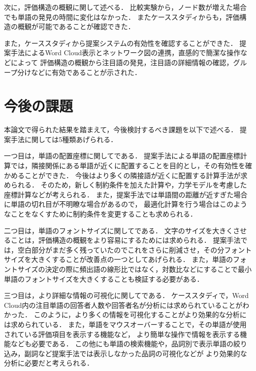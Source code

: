 \documentclass[syuuron]{kuee}
\begin{document}
		次に，評価構造の概観に関して述べる．
		比較実験から，ノード数が増えた場合でも単語の発見の時間に変化はなかった．
		またケーススタディからも，評価構造の概観が可能であることが確認できた．
		
		また，ケーススタディから提案システムの有効性を確認することができた．
		提案手法によるWord Cloud表示とネットワーク図の連携，直感的で簡潔な操作などによって
		評価構造の概観から注目語の発見，注目語の詳細情報の確認，グループ分けなどに有効であることが示された．		
		
	\section{今後の課題}
		本論文で得られた結果を踏まえて，今後検討するべき課題を以下で述べる．
		提案手法に関しては5種類あげられる．
		
		一つ目は，単語の配置座標に関してである．
		提案手法による単語の配置座標計算では，隣接関係にある単語が近くに配置することを目的とし，その有効性を確かめることができた．
		今後はより多くの隣接語が近くに配置する計算手法が求められる．
		そのため，新しく制約条件を加えた計算や，力学モデルを考慮した座標計算などが考えられる．
		また，提案手法では単語間の距離が近すぎた場合に単語の切れ目が不明瞭な場合があるので，
		最適化計算を行う場合はこのようなことをなくすために制約条件を変更することも求められる．
		
		二つ目は，単語のフォントサイズに関してである．
		文字のサイズを大きくさせることは，評価構造の概観をより容易にするためには求められる．
		提案手法では，空白部分がまだ多く残っていたのでこれをさらに削減させ，その分フォントサイズを大きくすることが改善点の一つとしてあげられる．
		また，単語のフォントサイズの決定の際に頻出語の線形比ではなく，対数比などにすることで最小単語のフォントサイズを大きくすることも検証する必要がある．
		
		三つ目は，より詳細な情報の可視化に関してである．
		ケーススタディで，Word Cloud内の注目単語の回答者人数や回答者名が分析には求められていることがわかった．
		このように，より多くの情報を可視化することがより効果的な分析には求められている．
		また，単語をマウスオーバーすることで，その単語が使用されている評価項目を表示する機能など，
		より簡単な操作で情報を表示する機能なども必要である．
		この他にも単語の検索機能や，品詞別で表示単語の絞り込み，副詞など提案手法では表示しなかった品詞の可視化などが
		より効果的な分析に必要だと考えられる．
		
\end{document}

